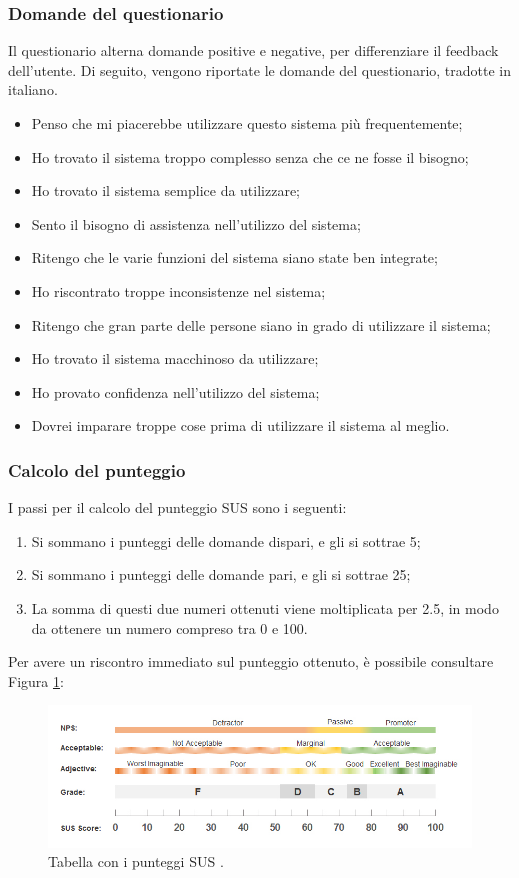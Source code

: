 \subsubsection{Domande del questionario}
Il questionario alterna domande positive e negative, per differenziare il feedback dell'utente.
Di seguito, vengono riportate le domande del questionario, tradotte in italiano.
\begin{itemize}
  \item Penso che mi piacerebbe utilizzare questo sistema più frequentemente;
  \item Ho trovato il sistema troppo complesso senza che ce ne fosse il bisogno;
  \item Ho trovato il sistema semplice da utilizzare;
  \item Sento il bisogno di assistenza nell'utilizzo del sistema;
  \item Ritengo che le varie funzioni del sistema siano state ben integrate;
  \item Ho riscontrato troppe inconsistenze nel sistema;
  \item Ritengo che gran parte delle persone siano in grado di utilizzare il sistema;
  \item Ho trovato il sistema macchinoso da utilizzare;
  \item Ho provato confidenza nell'utilizzo del sistema;
  \item Dovrei imparare troppe cose prima di utilizzare il sistema al meglio.
\end{itemize}

\subsubsection{Calcolo del punteggio}
I passi per il calcolo del punteggio SUS sono i seguenti:
\begin{enumerate}
  \item Si sommano i punteggi delle domande dispari, e gli si sottrae 5;
  \item Si sommano i punteggi delle domande pari, e gli si sottrae 25;
  \item La somma di questi due numeri ottenuti viene moltiplicata per 2.5, in modo da ottenere un numero compreso tra 0 e 100.
\end{enumerate}
Per avere un riscontro immediato sul punteggio ottenuto, è possibile consultare Figura \ref{fig:sus}:

\begin{figure}[h]
  \includegraphics[width=\linewidth]{img/sus.jpg}
  \caption{Tabella con i punteggi SUS \cite{sus}.}
  \label{fig:sus}
\end{figure}

